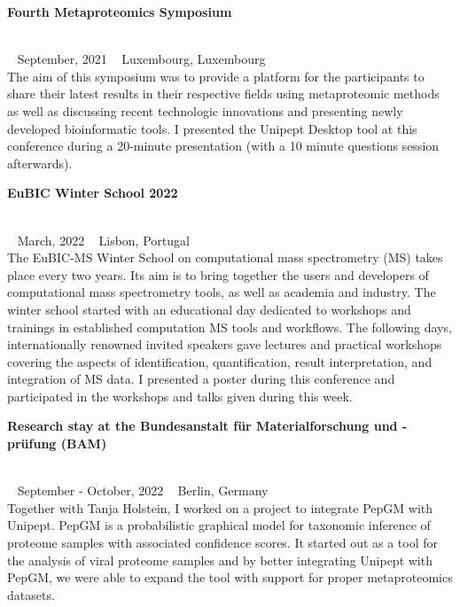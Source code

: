 \pagebreak

\begin{large}\textbf{\textsf{Fourth Metaproteomics Symposium}}\end{large} \\
\faCalendar ~ \textsf{September, 2021} \hfill \faGlobe ~ \textsf{Luxembourg, Luxembourg} \\
The aim of this symposium was to provide a platform for the participants to share their latest results in their respective fields using metaproteomic methods as well as discussing recent technologic innovations and presenting newly developed bioinformatic tools.
I presented the Unipept Desktop tool at this conference during a 20-minute presentation (with a 10 minute questions session afterwards).

\begin{large}\textbf{\textsf{EuBIC Winter School 2022}}\end{large} \\
\faCalendar ~ \textsf{March, 2022} \hfill \faGlobe ~ \textsf{Lisbon, Portugal} \\
The EuBIC-MS Winter School on computational mass spectrometry (MS) takes place every two years.
Its aim is to bring together the users and developers of computational mass spectrometry tools, as well as academia and industry.
The winter school started with an educational day dedicated to workshops and trainings in established computation MS tools and workflows.
The following days, internationally renowned invited speakers gave lectures and practical workshops covering the aspects of identification, quantification, result interpretation, and integration of MS data.
I presented a poster during this conference and participated in the workshops and talks given during this week.

\begin{large}\textbf{\textsf{Research stay at the Bundesanstalt für Materialforschung und -prüfung (BAM)}}\end{large} \\
\faCalendar ~ \textsf{September - October, 2022} \hfill \faGlobe ~ \textsf{Berlin, Germany} \\
Together with Tanja Holstein, I worked on a project to integrate PepGM with Unipept.
PepGM is a probabilistic graphical model for taxonomic inference of proteome samples with associated confidence scores.
It started out as a tool for the analysis of viral proteome samples and by better integrating Unipept with PepGM, we were able to expand the tool with support for proper metaproteomics datasets.


